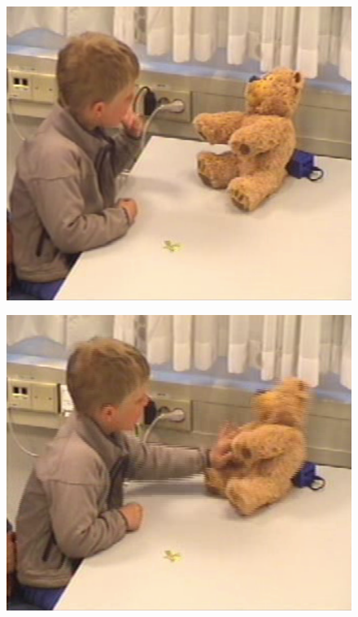 \begin{figure}
	\begin{minipage}[t]{0.3\linewidth}
		\centering
			\includegraphics[width=0.20\paperwidth]{Pictures/usability-pictures/knockout1.png}
		\label{fig:child-knockout1}
	\end{minipage}
	\hspace{0.5cm}
	\begin{minipage}[t]{0.3\linewidth}
		\centering
			\includegraphics[width=0.20\paperwidth]{Pictures/usability-pictures/knockout2.png}

\end{minipage}
\end{figure}
